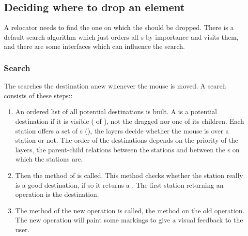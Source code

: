 

\subsection{Deciding where to drop an element}
A relocator needs to find the one  on which the  should be dropped. There is a default search algorithm which just orders all s by importance and visits them, and there are some interfaces which can influence the search.

\subsubsection{Search}
The  searches the destination anew whenever the mouse is moved. A search consists of these steps::
\begin{enumerate}
 \item An ordered list of all potential destinations is built. A  is a potential destination if it is visible ( of ), not the dragged  nor one of its children. Each station offers a set of s (), the layers decide whether the mouse is over a station or not. The order of the destinations depends on the priority of the layers, the parent-child relations between the stations and between the s on which the stations are.
 \item Then the method  of  is called. This method checks whether the station really is a good destination, if so it returns a . The first station returning an operation is the destination.
 \item The method  of the new operation is called, the method  on the old operation. The new operation will paint some markings to give a visual feedback to the user.
\end{enumerate}

